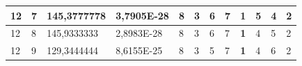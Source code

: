 \documentclass[conference]{IEEEtran}
\begin{document}
\begin{table}[]
\begin{tabular}{|llll|llllllll|}
\multicolumn{1}{|l|}{12}                                                             & \multicolumn{1}{l|}{7}                                                                 & \multicolumn{1}{l|}{145,3777778}                                                           & 3,7905E-28                              & \multicolumn{1}{l|}{8}                                                           & \multicolumn{1}{l|}{3}                                                           & \multicolumn{1}{l|}{6}                                                           & \multicolumn{1}{l|}{7}                                                           & \multicolumn{1}{l|}{\textbf{1}}                                                  & \multicolumn{1}{l|}{5}                                                           & \multicolumn{1}{l|}{4}                                                           & 2                                   \\ \hline
\multicolumn{1}{|l|}{12}                                                             & \multicolumn{1}{l|}{8}                                                                 & \multicolumn{1}{l|}{145,9333333}                                                           & 2,8983E-28                              & \multicolumn{1}{l|}{8}                                                           & \multicolumn{1}{l|}{3}                                                           & \multicolumn{1}{l|}{6}                                                           & \multicolumn{1}{l|}{7}                                                           & \multicolumn{1}{l|}{\textbf{1}}                                                  & \multicolumn{1}{l|}{4}                                                           & \multicolumn{1}{l|}{5}                                                           & 2                                   \\ \hline
\multicolumn{1}{|l|}{12}                                                             & \multicolumn{1}{l|}{9}                                                                 & \multicolumn{1}{l|}{129,3444444}                                                           & 8,6155E-25                              & \multicolumn{1}{l|}{8}                                                           & \multicolumn{1}{l|}{3}                                                           & \multicolumn{1}{l|}{5}                                                           & \multicolumn{1}{l|}{7}                                                           & \multicolumn{1}{l|}{\textbf{1}}                                                  & \multicolumn{1}{l|}{4}                                                           & \multicolumn{1}{l|}{6}                                                           & 2                                   \\ \hline

\end{tabular}
\end{table}
\end{document}
